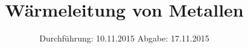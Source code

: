 

\subject{204}
\title{Wärmeleitung von Metallen}
\date{
  Durchführung: 10.11.2015
  \hspace{3em}
  Abgabe: 17.11.2015
}



\maketitle
\thispagestyle{empty}
\tableofcontents
\newpage






\printbibliography


